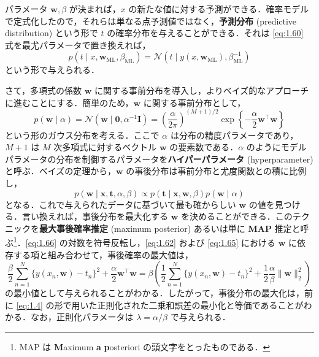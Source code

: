 \documentclass[uplatex,a4paper,oneside,openany,dvipdfmx]{jsarticle}
\numberwithin{equation}{section}
\theoremstyle{mystyle} %
\newcommand{\CN}{\mathcal{N}}
\newcommand{\mb}[1]{\mathbf{#1}}
\newcommand{\tb}[1]{\textbf{#1}}
\newcommand{\bs}[1]{\boldsymbol{#1}}
\newcommand{\norm}[1]{\|#1\|}
\begin{document}
パラメータ $\bs{w},\beta$ が決まれば，$x$ の新たな値に対する予測ができる．確率モデルで定式化したので，それらは単なる点予測値ではなく，\tb{予測分布} (predictive distribution) という形で $t$ の確率分布を与えることができる．それは \eqref{eq:1.60} 式を最尤パラメータで置き換えれば，
\begin{equation} \label{eq:1.64}
    p(t \mid x,\bs{w}_{\text{ML}},\beta_{\text{ML}}) = \CN(t \mid y(x,\bs{w}_{\text{ML}}),\beta_{\text{ML}}^{-1})
\end{equation}
という形で与えられる．

さて，多項式の係数 $\bs{w}$ に関する事前分布を導入し，よりベイズ的なアプローチに進むことにする．簡単のため，$\bs{w}$ に関する事前分布として，
\begin{equation} \label{eq:1.65}
    p(\bs{w} \mid \alpha) = \CN(\bs{w} \mid \bs{0},\alpha^{-1}\mb{I}) = \left(\frac{\alpha}{2\pi}\right)^{(M+1)/2} \exp{\left\{-\frac{\alpha}{2} \bs{w}^{\top}\bs{w}\right\}}
\end{equation}
という形のガウス分布を考える．ここで $\alpha$ は分布の精度パラメータであり，$M+1$ は $M$ 次多項式に対するベクトル $\bs{w}$ の要素数である．$\alpha$ のようにモデルパラメータの分布を制御するパラメータを\tb{ハイパーパラメータ} (hyperparameter) と呼ぶ．ベイズの定理から，$\bs{w}$ の事後分布は事前分布と尤度関数との積に比例し，
\begin{equation} \label{eq:1.66}
    p(\bs{w} \mid \mb{x},\mb{t},\alpha,\beta) \propto p(\mb{t} \mid \mb{x},\bs{w},\beta) p(\bs{w} \mid \alpha)
\end{equation}
となる．これで与えられたデータに基づいて最も確からしい $\bs{w}$ の値を見つける．言い換えれば，事後分布を最大化する $\bs{w}$ を決めることができる．このテクニックを\tb{最大事後確率推定} (maximum posterior) あるいは単に \tb{MAP} 推定と呼ぶ\footnote{MAP は \tb{M}aximum \tb{a} \tb{p}osteriori の頭文字をとったものである．}．\eqref{eq:1.66} の対数を符号反転し，\eqref{eq:1.62} および \eqref{eq:1.65} における $\bs{w}$ に依存する項と組み合わせて，事後確率の最大値は，
\begin{equation} \label{eq:1.67}
    \frac{\beta}{2} \sum_{n=1}^{N} \{y(x_{n},\bs{w}) - t_{n}\}^{2} + \frac{\alpha}{2} \bs{w}^{\top}\bs{w} = \beta \left(\frac{1}{2} \sum_{n=1}^{N} \{y(x_{n},\bs{w}) - t_{n}\}^{2} + \frac{1}{2} \frac{\alpha}{\beta} \norm{\bs{w}}_{2}^{2}\right)
\end{equation}
の最小値として与えられることがわかる．したがって，事後分布の最大化は，前に \eqref{eq:1.4} の形で用いた正則化された二乗和誤差の最小化と等価であることがわかる．なお，正則化パラメータは $\lambda = \alpha/\beta$ で与えられる．
\end{document}
